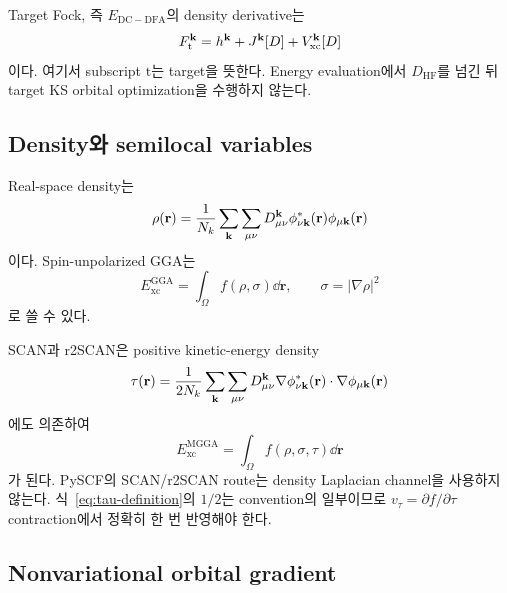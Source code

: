 Target Fock, 즉 $E_{\mathrm{DC-DFA}}$의 density derivative는
\begin{equation}
  F_{\mathrm t}^{\mathbf{k}}
  =h^{\mathbf{k}}+J^{\mathbf{k}}[D]+V_{\mathrm{xc}}^{\mathbf{k}}[D]
  \label{eq:target-fock}
\end{equation}
이다. 여기서 subscript $\mathrm t$는 target을 뜻한다. Energy evaluation에서
$D_{\mathrm{HF}}$를 넘긴 뒤 target KS orbital optimization을 수행하지 않는다.

\subsection{Density와 semilocal variables}

Real-space density는
\begin{equation}
  \rho(\mathbf r)
  =\frac{1}{N_k}\sum_{\mathbf{k}}\sum_{\mu\nu}
    D_{\mu\nu}^{\mathbf{k}}
    \phi_{\nu\mathbf{k}}^{*}(\mathbf r)
    \phi_{\mu\mathbf{k}}(\mathbf r)
  \label{eq:real-space-density}
\end{equation}
이다. Spin-unpolarized GGA는
\begin{equation}
  E_{\mathrm{xc}}^{\mathrm{GGA}}
  =\int_\Omega
    f\!\left(\rho,\sigma\right)\dd\mathbf r,
  \qquad
  \sigma=|\nabla\rho|^2
  \label{eq:gga-energy}
\end{equation}
로 쓸 수 있다.

SCAN과 r2SCAN은 positive kinetic-energy density
\begin{equation}
  \tau(\mathbf r)
  =\frac{1}{2N_k}\sum_{\mathbf{k}}\sum_{\mu\nu}
   D_{\mu\nu}^{\mathbf{k}}
   \nabla\phi_{\nu\mathbf{k}}^{*}(\mathbf r)\cdot
   \nabla\phi_{\mu\mathbf{k}}(\mathbf r)
  \label{eq:tau-definition}
\end{equation}
에도 의존하여
\begin{equation}
  E_{\mathrm{xc}}^{\mathrm{MGGA}}
  =\int_\Omega f(\rho,\sigma,\tau)\dd\mathbf r
  \label{eq:mgga-energy}
\end{equation}
가 된다. PySCF의 SCAN/r2SCAN route는 density Laplacian channel을 사용하지 않는다.
식~\eqref{eq:tau-definition}의 $1/2$는 convention의 일부이므로 $v_\tau=\partial
f/\partial\tau$ contraction에서 정확히 한 번 반영해야 한다.

\subsection{Nonvariational orbital gradient}

